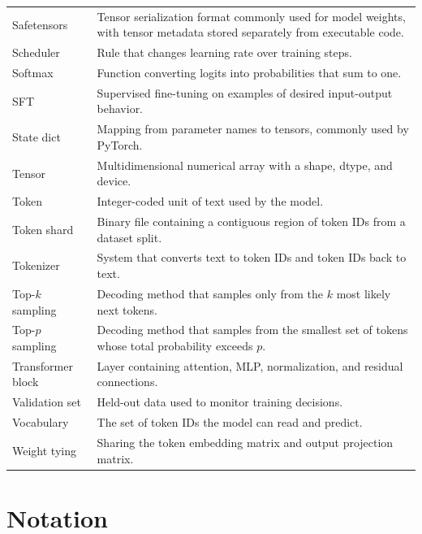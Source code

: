\begin{longtable}{p{}p{}}
Safetensors & Tensor serialization format commonly used for model weights, with tensor metadata stored separately from executable code. \\
Scheduler & Rule that changes learning rate over training steps. \\
Softmax & Function converting logits into probabilities that sum to one. \\
SFT & Supervised fine-tuning on examples of desired input-output behavior. \\
State dict & Mapping from parameter names to tensors, commonly used by PyTorch. \\
Tensor & Multidimensional numerical array with a shape, dtype, and device. \\
Token & Integer-coded unit of text used by the model. \\
Token shard & Binary file containing a contiguous region of token IDs from a dataset split. \\
Tokenizer & System that converts text to token IDs and token IDs back to text. \\
Top-\(k\) sampling & Decoding method that samples only from the \(k\) most likely next tokens. \\
Top-\(p\) sampling & Decoding method that samples from the smallest set of tokens whose total probability exceeds \(p\). \\
Transformer block & Layer containing attention, MLP, normalization, and residual connections. \\
Validation set & Held-out data used to monitor training decisions. \\
Vocabulary & The set of token IDs the model can read and predict. \\
Weight tying & Sharing the token embedding matrix and output projection matrix. \\
\bottomrule
\end{longtable}

\section{Notation}

